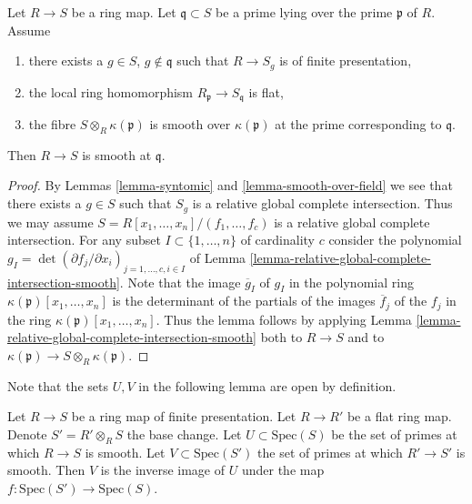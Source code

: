 \begin{lemma}
\label{lemma-flat-fibre-smooth}
Let $R \to S$ be a ring map.
Let $\mathfrak q \subset S$ be a prime lying over the
prime $\mathfrak p$ of $R$. Assume
\begin{enumerate}
\item there exists a $g \in S$, $g \not\in \mathfrak q$
such that $R \to S_g$ is of finite presentation,
\item the local ring homomorphism
$R_{\mathfrak p} \to S_{\mathfrak q}$ is flat,
\item the fibre $S \otimes_R \kappa(\mathfrak p)$ is smooth
over $\kappa(\mathfrak p)$ at the prime corresponding
to $\mathfrak q$.
\end{enumerate}
Then $R \to S$ is smooth at $\mathfrak q$.
\end{lemma}

\begin{proof}
By Lemmas \ref{lemma-syntomic} and \ref{lemma-smooth-over-field}
we see that there exists a $g \in S$ such that $S_g$ is a 
relative global complete intersection. Thus we may assume
$S = R[x_1, \ldots, x_n]/(f_1, \ldots, f_c)$ is a relative
global complete intersection.
For any subset $I \subset \{1, \ldots, n\}$ of cardinality
$c$ consider the polynomial
$g_I = \det (\partial f_j/\partial x_i)_{j = 1, \ldots, c, i \in I}$
of Lemma \ref{lemma-relative-global-complete-intersection-smooth}.
Note that the image $\overline{g}_I$ of $g_I$ in the polynomial ring
$\kappa(\mathfrak p)[x_1, \ldots, x_n]$ is the determinant
of the partials of the images $\overline{f}_j$ of the $f_j$ in the ring
$\kappa(\mathfrak p)[x_1, \ldots, x_n]$. Thus the lemma follows
by applying Lemma \ref{lemma-relative-global-complete-intersection-smooth}
both to $R \to S$ and to
$\kappa(\mathfrak p) \to S \otimes_R \kappa(\mathfrak p)$.
\end{proof}

\noindent
Note that the sets $U, V$ in the following lemma
are open by definition.

\begin{lemma}
\label{lemma-flat-base-change-locus-smooth}
Let $R \to S$ be a ring map of finite presentation.
Let $R \to R'$ be a flat ring map.
Denote $S' = R' \otimes_R S$ the base change.
Let $U \subset \text{Spec}(S)$ be the set of primes at
which $R \to S$ is smooth.
Let $V \subset \text{Spec}(S')$ the set of primes at
which $R' \to S'$ is smooth.
Then $V$ is the inverse image of $U$ under the
map $f : \text{Spec}(S') \to \text{Spec}(S)$.
\end{lemma}

